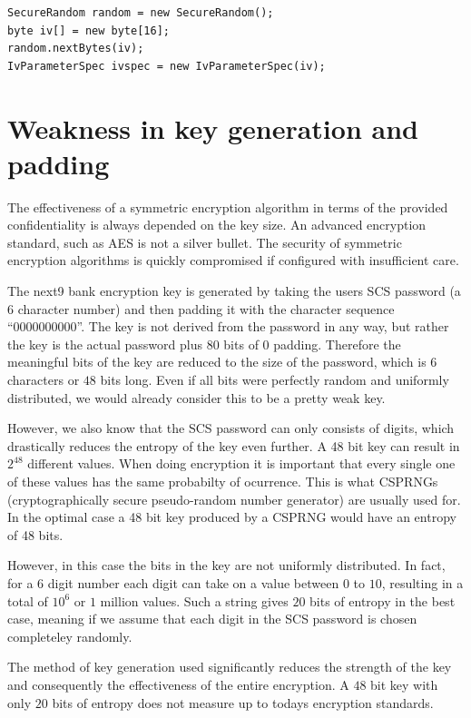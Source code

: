 \begin{lstlisting}[caption= Java IV generation,label=listing:javaiv]
SecureRandom random = new SecureRandom();
byte iv[] = new byte[16];
random.nextBytes(iv);
IvParameterSpec ivspec = new IvParameterSpec(iv);
\end{lstlisting}

\chapter{Weakness in key generation and padding}
The effectiveness of a symmetric encryption algorithm in terms of the provided confidentiality is always depended on the key size. An advanced encryption standard, such as AES is not a silver bullet. The security of symmetric encryption algorithms is quickly compromised if configured with insufficient care.


The next9 bank encryption key is generated by taking the users SCS password (a $6$ character number) and then padding it with the character sequence ``0000000000''. The key is not derived from the password in any way, but rather the key is the actual password plus $80$ bits of $0$ padding. Therefore the meaningful bits of the key are reduced to the size of the password, which is $6$ characters or $48$ bits long. Even if all bits were perfectly random and uniformly distributed, we would already consider this to be a pretty weak key.

However, we also know that the SCS password can only consists of digits, which drastically reduces the entropy of the key even further. A 48 bit key can result in $2^{48}$ different values. When doing encryption it is important that every single one of these values has the same probabilty of ocurrence. This is what CSPRNGs (cryptographically secure pseudo-random number generator) are usually used for.  In the optimal case a 48 bit key produced by a CSPRNG would have an entropy of 48 bits.

However, in this case the bits in the key are not uniformly distributed. In fact, for a 6 digit number each digit can take on a value between $0$ to $10$, resulting in a total of $10^6$ or $1$ million values. Such a string gives $20$ bits of entropy in the best case, meaning if we assume that each digit in the SCS password is chosen completeley randomly. 

The method of key generation used significantly reduces the strength of the key and consequently the effectiveness of the entire encryption. A $48$ bit key with only $20$ bits of entropy does not measure up to todays encryption standards. 

